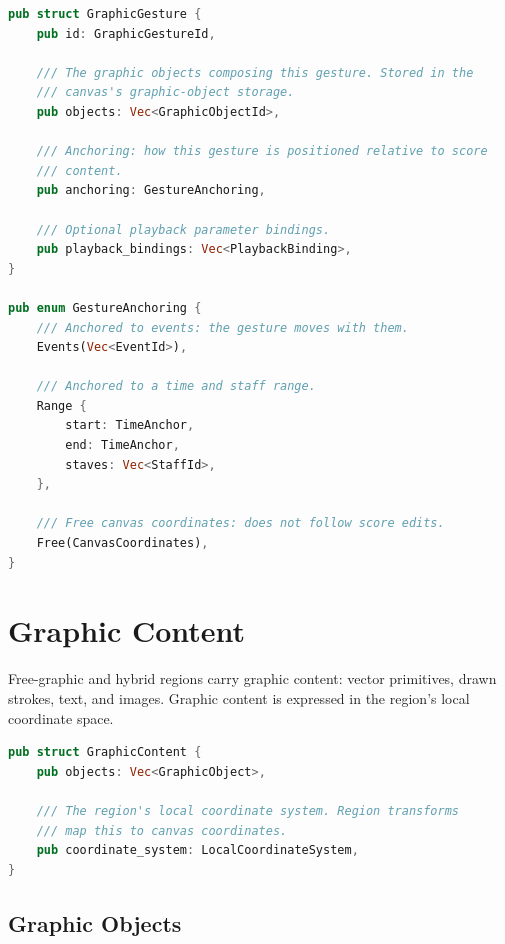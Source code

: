 \documentclass[11pt,letterpaper]{report}
\begin{document}
\begin{lstlisting}[language=Rust]
pub struct GraphicGesture {
    pub id: GraphicGestureId,

    /// The graphic objects composing this gesture. Stored in the
    /// canvas's graphic-object storage.
    pub objects: Vec<GraphicObjectId>,

    /// Anchoring: how this gesture is positioned relative to score
    /// content.
    pub anchoring: GestureAnchoring,

    /// Optional playback parameter bindings.
    pub playback_bindings: Vec<PlaybackBinding>,
}

pub enum GestureAnchoring {
    /// Anchored to events: the gesture moves with them.
    Events(Vec<EventId>),

    /// Anchored to a time and staff range.
    Range {
        start: TimeAnchor,
        end: TimeAnchor,
        staves: Vec<StaffId>,
    },

    /// Free canvas coordinates: does not follow score edits.
    Free(CanvasCoordinates),
}
\end{lstlisting}

\section{Graphic Content}
\label{sec:graph:graphic}

Free-graphic and hybrid regions carry graphic content: vector
primitives, drawn strokes, text, and images. Graphic content is
expressed in the region's local coordinate space.

\begin{lstlisting}[language=Rust]
pub struct GraphicContent {
    pub objects: Vec<GraphicObject>,

    /// The region's local coordinate system. Region transforms
    /// map this to canvas coordinates.
    pub coordinate_system: LocalCoordinateSystem,
}
\end{lstlisting}

\subsection{Graphic Objects}
\end{document}
